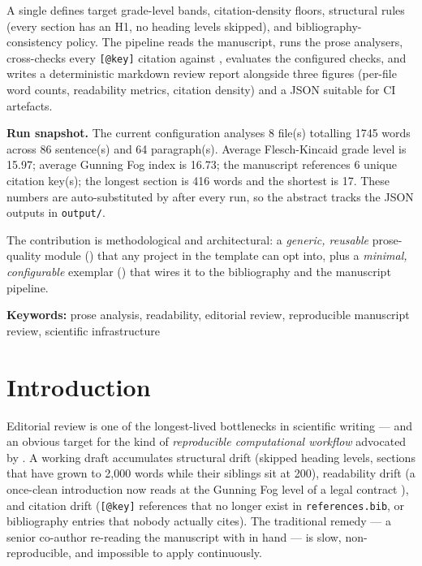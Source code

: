 \documentclass[
  english,
]{article}
\begin{document}
A single  defines target grade-level
bands, citation-density floors, structural rules (every section has an
H1, no heading levels skipped), and bibliography-consistency policy. The
pipeline reads the manuscript, runs the prose analysers, cross-checks
every \texttt{{[}@key{]}} citation against
, evaluates the configured checks, and
writes a deterministic markdown review report alongside three figures
(per-file word counts, readability metrics, citation density) and a JSON
 suitable for CI artefacts.

\textbf{Run snapshot.} The current configuration analyses 8 file(s)
totalling 1745 words across 86 sentence(s) and 64 paragraph(s). Average
Flesch-Kincaid grade level is 15.97; average Gunning Fog index is 16.73;
the manuscript references 6 unique citation key(s); the longest section
is 416 words and the shortest is 17. These numbers are auto-substituted
by  after every
run, so the abstract tracks the JSON outputs in \texttt{output/}.

The contribution is methodological and architectural: a \emph{generic,
reusable} prose-quality module () that any
project in the template can opt into, plus a \emph{minimal,
configurable} exemplar
() that wires it to
the bibliography and the manuscript pipeline.

\textbf{Keywords:} prose analysis, readability, editorial review,
reproducible manuscript review, scientific infrastructure

\newpage

\section{Introduction}\label{sec:introduction}

Editorial review is one of the longest-lived bottlenecks in scientific
writing --- and an obvious target for the kind of \emph{reproducible
computational workflow} advocated by \citep{peng2011reproducible}. A
working draft accumulates structural drift (skipped heading levels,
sections that have grown to 2,000 words while their siblings sit at
200), readability drift (a once-clean introduction now reads at the
Gunning Fog level of a legal contract \citep{gunning1952technique}), and
citation drift (\texttt{{[}@key{]}} references that no longer exist in
\texttt{references.bib}, or bibliography entries that nobody actually
cites). The traditional remedy --- a senior co-author re-reading the
manuscript with \citep{strunk2000elements} in hand --- is slow,
non-reproducible, and impossible to apply continuously.
\end{document}
